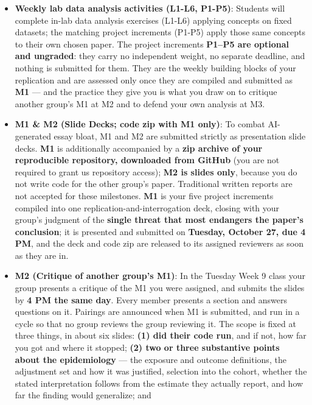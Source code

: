 \documentclass[
]{article}
\providecommand{\tightlist}{%
  \setlength{\itemsep}{0pt}\setlength{\parskip}{0pt}}
\begin{document}
\begin{itemize}
\tightlist
\item
  \textbf{Weekly lab data analysis activities (L1-L6, P1-P5)}: Students
  will complete in-lab data analysis exercises (L1-L6) applying concepts
  on fixed datasets; the matching project increments (P1-P5) apply those
  same concepts to their own chosen paper. The project increments
  \textbf{P1--P5 are optional and ungraded}: they carry no independent
  weight, no separate deadline, and nothing is submitted for them. They
  are the weekly building blocks of your replication and are assessed
  only once they are compiled and submitted as \textbf{M1} --- and the
  practice they give you is what you draw on to critique another group's
  M1 at M2 and to defend your own analysis at M3.
\item
  \textbf{M1 \& M2 (Slide Decks; code zip with M1 only)}: To combat
  AI-generated essay bloat, M1 and M2 are submitted strictly as
  presentation slide decks. \textbf{M1} is additionally accompanied by a
  \textbf{zip archive of your reproducible repository, downloaded from
  GitHub} (you are not required to grant us repository access);
  \textbf{M2 is slides only}, because you do not write code for the
  other group's paper. Traditional written reports are not accepted for
  these milestones. \textbf{M1} is your five project increments compiled
  into one replication-and-interrogation deck, closing with your group's
  judgment of the \textbf{single threat that most endangers the paper's
  conclusion}; it is presented and submitted on \textbf{Tuesday, October
  27, due 4 PM}, and the deck and code zip are released to its assigned
  reviewers as soon as they are in.
\item
  \textbf{M2 (Critique of another group's M1)}: In the Tuesday Week 9
  class your group presents a critique of the M1 you were assigned, and
  submits the slides by \textbf{4 PM the same day}. Every member
  presents a section and answers questions on it. Pairings are announced
  when M1 is submitted, and run in a cycle so that no group reviews the
  group reviewing it. The scope is fixed at three things, in about six
  slides: \textbf{(1) did their code run}, and if not, how far you got
  and where it stopped; \textbf{(2) two or three substantive points
  about the epidemiology} --- the exposure and outcome definitions, the
  adjustment set and how it was justified, selection into the cohort,
  whether the stated interpretation follows from the estimate they
  actually report, and how far the finding would generalize; and

\end{itemize}
\end{document}
